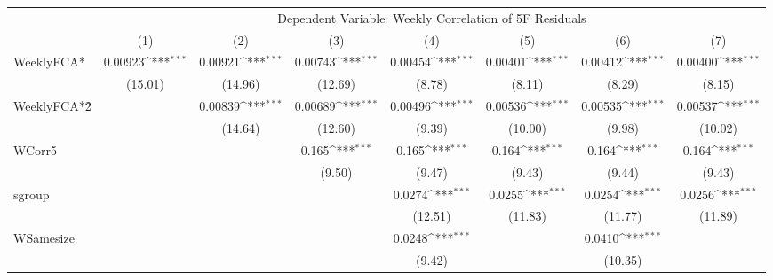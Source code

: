 {
\def\sym#1{\ifmmode^{#1}\else\(^{#1}\)\fi}
\begin{tabular}{l*{7}{c}}
\hline\hline
  & \multicolumn{7}{c}{Dependent Variable: Weekly Correlation of 5F Residuals}                 \\
  \cline{2-8}
                    &\multicolumn{1}{c}{(1)}         &\multicolumn{1}{c}{(2)}         &\multicolumn{1}{c}{(3)}         &\multicolumn{1}{c}{(4)}         &\multicolumn{1}{c}{(5)}         &\multicolumn{1}{c}{(6)}         &\multicolumn{1}{c}{(7)}         \\
\hline
WeeklyFCA*          &     0.00923\sym{***}&     0.00921\sym{***}&     0.00743\sym{***}&     0.00454\sym{***}&     0.00401\sym{***}&     0.00412\sym{***}&     0.00400\sym{***}\\
                    &     (15.01)         &     (14.96)         &     (12.69)         &      (8.78)         &      (8.11)         &      (8.29)         &      (8.15)         \\
[1em]
WeeklyFCA*\^2       &                     &     0.00839\sym{***}&     0.00689\sym{***}&     0.00496\sym{***}&     0.00536\sym{***}&     0.00535\sym{***}&     0.00537\sym{***}\\
                    &                     &     (14.64)         &     (12.60)         &      (9.39)         &     (10.00)         &      (9.98)         &     (10.02)         \\
[1em]
WCorr5              &                     &                     &       0.165\sym{***}&       0.165\sym{***}&       0.164\sym{***}&       0.164\sym{***}&       0.164\sym{***}\\
                    &                     &                     &      (9.50)         &      (9.47)         &      (9.43)         &      (9.44)         &      (9.43)         \\
[1em]
sgroup              &                     &                     &                     &      0.0274\sym{***}&      0.0255\sym{***}&      0.0254\sym{***}&      0.0256\sym{***}\\
                    &                     &                     &                     &     (12.51)         &     (11.83)         &     (11.77)         &     (11.89)         \\
[1em]
WSamesize           &                     &                     &                     &      0.0248\sym{***}&                     &      0.0410\sym{***}&                     \\
                    &                     &                     &                     &      (9.42)         &                     &     (10.35)         &                     \\

\end{tabular}}
